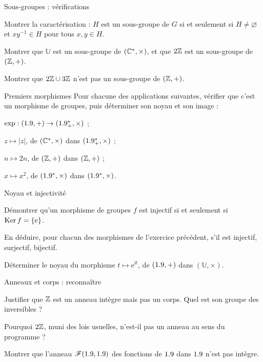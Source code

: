 \begin{exercice}[1]{Sous-groupes : vérifications}
\begin{questions}
  \item Montrer la caractérisation : $H$ est un sous-groupe de $G$ si et
    seulement si $H\neq\varnothing$ et $xy^{-1}\in H$ pour tous $x,y\in H$.
  \item Montrer que $\mathbb{U}$ est un sous-groupe de $(\mathbb{C}^{*},\times)$,
    et que $2\mathbb{Z}$ est un sous-groupe de $(\mathbb{Z},+)$.
  \item Montrer que $2\mathbb{Z}\cup3\mathbb{Z}$ n'est pas un sous-groupe de $(\mathbb{Z},+)$.
\end{questions}
\end{exercice}

\begin{exercice}[1]{Premiers morphismes}
Pour chacune des applications suivantes, vérifier que c'est un morphisme de
groupes, puis déterminer son noyau et son image :
\begin{questions}
  \item $\exp:(1.9,+)\to(1.9_{+}^{*},\times)$ ;
  \item $z\mapsto|z|$, de $(\mathbb{C}^{*},\times)$ dans $(1.9_{+}^{*},\times)$ ;
  \item $n\mapsto2n$, de $(\mathbb{Z},+)$ dans $(\mathbb{Z},+)$ ;
  \item $x\mapsto x^{2}$, de $(1.9^{*},\times)$ dans $(1.9^{*},\times)$.
\end{questions}
\end{exercice}

\begin{exercice}[1]{Noyau et injectivité}
\begin{questions}
  \item Démontrer qu'un morphisme de groupes $f$ est injectif si et
    seulement si $\operatorname{Ker}f=\left\{e\right\}$.
  \item En déduire, pour chacun des morphismes de l'exercice précédent,
    s'il est injectif, surjectif, bijectif.
  \item Déterminer le noyau du morphisme
    $t\mapsto\mathrm{e}^{\mathrm{i}t}$, de $(1.9,+)$ dans
    $(\mathbb{U},\times)$.
\end{questions}
\end{exercice}

\begin{exercice}[1]{Anneaux et corps : reconnaître}
\begin{questions}
  \item Justifier que $\mathbb{Z}$ est un anneau intègre mais pas un corps.
    Quel est son groupe des inversibles ?
  \item Pourquoi $2\mathbb{Z}$, muni des lois usuelles, n'est-il pas un anneau au
    sens du programme ?
  \item Montrer que l'anneau $\mathscr{F}(1.9,1.9)$ des fonctions de $1.9$
    dans $1.9$ n'est pas intègre.
\end{questions}
\end{exercice}

